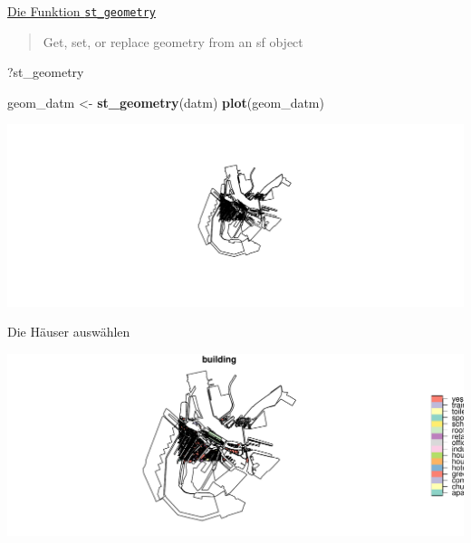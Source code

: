 \documentclass[ignorenonframetext,]{beamer}
\newenvironment{Shaded}{\begin{snugshade}}{\end{snugshade}}
\newcommand{\KeywordTok}[1]{\textcolor[rgb]{0.13,0.29,0.53}{\textbf{#1}}}
\newcommand{\NormalTok}[1]{#1}
\newcommand{\OperatorTok}[1]{\textcolor[rgb]{0.81,0.36,0.00}{\textbf{#1}}}
\newcommand{\StringTok}[1]{\textcolor[rgb]{0.31,0.60,0.02}{#1}}
\begin{document}
\begin{frame}[fragile]{\href{https://cran.r-project.org/web/packages/sf/vignettes/sf3.html}{Die
Funktion \texttt{st\_geometry}}}
\protect\hypertarget{die-funktion-st_geometry}{}

\begin{quote}
Get, set, or replace geometry from an sf object
\end{quote}

\begin{Shaded}
\begin{Highlighting}[]
\NormalTok{?st_geometry}
\end{Highlighting}
\end{Shaded}

\begin{Shaded}
\begin{Highlighting}[]
\NormalTok{geom_datm <-}\StringTok{ }\KeywordTok{st_geometry}\NormalTok{(datm)}
\KeywordTok{plot}\NormalTok{(geom_datm)}
\end{Highlighting}
\end{Shaded}

\includegraphics{B7_simplefeatures_files/figure-beamer/unnamed-chunk-20-1.pdf}

\end{frame}

\begin{frame}[fragile]{Die Häuser auswählen}
\protect\hypertarget{die-hauser-auswahlen}{}

\begin{Shaded}
\end{Shaded}

\includegraphics{B7_simplefeatures_files/figure-beamer/unnamed-chunk-21-1.pdf}

\end{frame}
\end{document}
